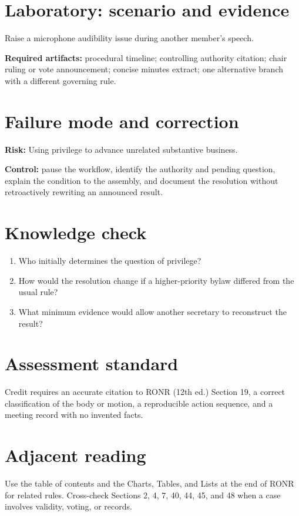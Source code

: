 \documentclass[11pt]{article}
\begin{document}
\section{Laboratory: scenario and evidence}
Raise a microphone audibility issue during another member’s speech.

\textbf{Required artifacts:} procedural timeline; controlling authority citation; chair ruling or vote announcement; concise minutes extract; one alternative branch with a different governing rule.

\section{Failure mode and correction}
\textbf{Risk:} Using privilege to advance unrelated substantive business.

\textbf{Control:} pause the workflow, identify the authority and pending question, explain the condition to the assembly, and document the resolution without retroactively rewriting an announced result.

\section{Knowledge check}
\begin{enumerate}[leftmargin=*,itemsep=4pt]
\item Who initially determines the question of privilege?
\item How would the resolution change if a higher-priority bylaw differed from the usual rule?
\item What minimum evidence would allow another secretary to reconstruct the result?
\end{enumerate}

\section{Assessment standard}
Credit requires an accurate citation to RONR (12th ed.) Section 19, a correct classification of the body or motion, a reproducible action sequence, and a meeting record with no invented facts.

\section{Adjacent reading}
Use the table of contents and the Charts, Tables, and Lists at the end of RONR for related rules. Cross-check Sections 2, 4, 7, 40, 44, 45, and 48 when a case involves validity, voting, or records.
\end{document}
